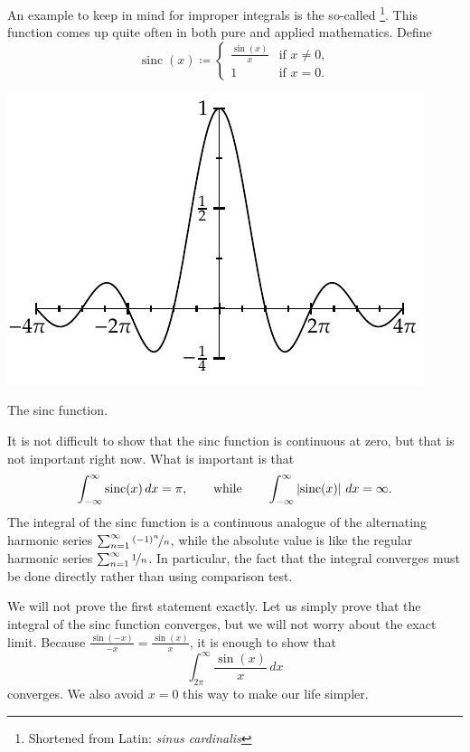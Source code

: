 \begin{example}
An example to keep in mind for improper integrals
is the so-called \emph{}%
\footnote{Shortened from Latin: \emph{sinus cardinalis}}.
This function comes up quite often
in both pure and applied mathematics.  Define
\begin{equation*}
\operatorname{sinc}(x) \coloneqq
\begin{cases}
\frac{\sin(x)}{x} & \text{if } x \not= 0 , \\
1 & \text{if } x = 0 .
\end{cases}
\end{equation*}
\begin{myfigureht}
\includegraphics{figures/sincfig}
\caption{The sinc function.\label{figsinc}}
\end{myfigureht}

It is not difficult to show that
the sinc function is continuous at zero, but that is
not important right now.  What is important is that
\begin{equation*}
\int_{-\infty}^\infty \operatorname{sinc}(x) \,dx = \pi ,
\qquad \text{while} \qquad
\int_{-\infty}^\infty \left\lvert {\operatorname{sinc}(x)} \right\rvert \,dx = \infty .
\end{equation*}
The integral of the sinc function is a continuous analogue of the
alternating harmonic series $\sum_{n=1}^\infty \nicefrac{{(-1)}^n}{n}$, while the
absolute value is like the regular harmonic series $\sum_{n=1}^\infty \nicefrac{1}{n}$.
In particular, the fact that the integral converges must be done directly
rather than using comparison test.

We will not prove the first statement exactly.  Let us simply prove
that the integral of the sinc function converges, but we will not worry
about the exact limit.  Because $\frac{\sin(-x)}{-x} = \frac{\sin(x)}{x}$, it is
enough to show that
\begin{equation*}
\int_{2\pi}^\infty \frac{\sin(x)}{x}\,dx
\end{equation*}
converges.  We
also avoid $x=0$ this way to make our life simpler.


\end{example}
